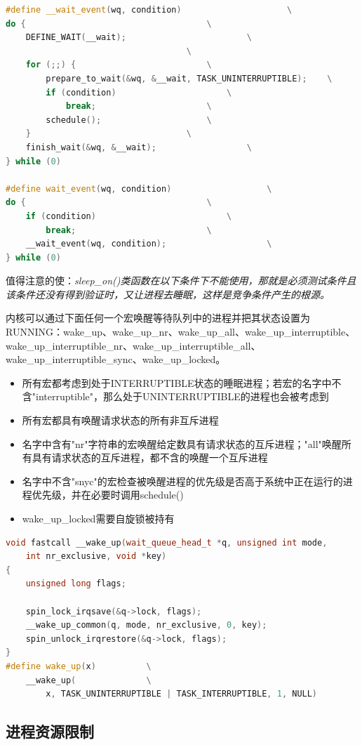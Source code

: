 \begin{lstlisting}[language=C++]    
#define __wait_event(wq, condition) 					\
do {									\
	DEFINE_WAIT(__wait);						\
									\
	for (;;) {							\
		prepare_to_wait(&wq, &__wait, TASK_UNINTERRUPTIBLE);	\
		if (condition)						\
			break;						\
		schedule();						\
	}								\
	finish_wait(&wq, &__wait);					\
} while (0)

#define wait_event(wq, condition) 					\
do {									\
    if (condition)	 						\
        break;							\
    __wait_event(wq, condition);					\
} while (0)
\end{lstlisting}

    值得注意的使：\emph{sleep\_on()类函数在以下条件下不能使用，那就是必须测试条件且该条件还没有得到验证时，又让进程去睡眠，这样是竞争条件产生的根源。}

    内核可以通过下面任何一个宏唤醒等待队列中的进程并把其状态设置为RUNNING：wake\_up、wake\_up\_nr、wake\_up\_all、wake\_up\_interruptible、wake\_up\_interruptible\_nr、wake\_up\_interruptible\_all、wake\_up\_interruptible\_sync、wake\_up\_locked。

\begin{itemize}
    \item 所有宏都考虑到处于INTERRUPTIBLE状态的睡眠进程；若宏的名字中不含"interruptible"，那么处于UNINTERRUPTIBLE的进程也会被考虑到
    \item 所有宏都具有唤醒请求状态的所有非互斥进程
    \item 名字中含有"nr"字符串的宏唤醒给定数具有请求状态的互斥进程；"all"唤醒所有具有请求状态的互斥进程，都不含的唤醒一个互斥进程
    \item 名字中不含"snyc"的宏检查被唤醒进程的优先级是否高于系统中正在运行的进程优先级，并在必要时调用schedule()
    \item wake\_up\_locked需要自旋锁被持有
\end{itemize}

\begin{lstlisting}[language=C++]
void fastcall __wake_up(wait_queue_head_t *q, unsigned int mode,
    int nr_exclusive, void *key)
{
    unsigned long flags;

    spin_lock_irqsave(&q->lock, flags);
    __wake_up_common(q, mode, nr_exclusive, 0, key);
    spin_unlock_irqrestore(&q->lock, flags);
} 
#define wake_up(x)			\
    __wake_up(              \
        x, TASK_UNINTERRUPTIBLE | TASK_INTERRUPTIBLE, 1, NULL)
\end{lstlisting}

\subsection{进程资源限制}

